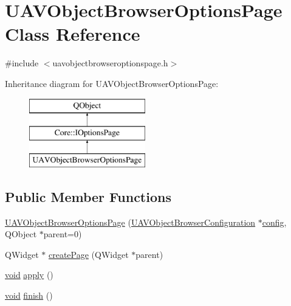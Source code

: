 \hypertarget{class_u_a_v_object_browser_options_page}{\section{U\-A\-V\-Object\-Browser\-Options\-Page Class Reference}
\label{class_u_a_v_object_browser_options_page}
}


{\ttfamily \#include $<$uavobjectbrowseroptionspage.\-h$>$}

Inheritance diagram for U\-A\-V\-Object\-Browser\-Options\-Page\-:\begin{figure}[H]
\begin{center}
\leavevmode
\includegraphics[height=3.000000cm]{class_u_a_v_object_browser_options_page}
\end{center}
\end{figure}
\subsection*{Public Member Functions}
\begin{DoxyCompactItemize}
\item 
\hyperlink{group___u_a_v_object_browser_plugin_gae101cd8e551d717a5421361feafa1cf0}{U\-A\-V\-Object\-Browser\-Options\-Page} (\hyperlink{class_u_a_v_object_browser_configuration}{U\-A\-V\-Object\-Browser\-Configuration} $\ast$\hyperlink{deflate_8c_a4473b5227787415097004fd39f55185e}{config}, Q\-Object $\ast$parent=0)
\item 
Q\-Widget $\ast$ \hyperlink{group___u_a_v_object_browser_plugin_gae567a8d4a9212e69b15f4cdb06c7ac09}{create\-Page} (Q\-Widget $\ast$parent)
\item 
\hyperlink{group___u_a_v_objects_plugin_ga444cf2ff3f0ecbe028adce838d373f5c}{void} \hyperlink{group___u_a_v_object_browser_plugin_ga13631605b54e41a066fa4f4d2472b072}{apply} ()
\item 
\hyperlink{group___u_a_v_objects_plugin_ga444cf2ff3f0ecbe028adce838d373f5c}{void} \hyperlink{group___u_a_v_object_browser_plugin_gabd2876750567bb091c8c009d2cca931f}{finish} ()
\end{DoxyCompactItemize}


